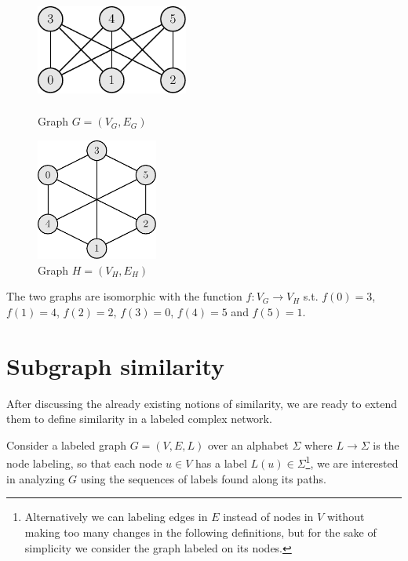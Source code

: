 \begin{esempio}
	\begin{figure}[h]
		\centering
		\begin{minipage}[t]{.45\textwidth}
			\centering
			\includegraphics[width=5cm,height=3.33cm]{figure/figure-2-3}
			\caption{Graph $G=(V_G, E_G)$}
		\end{minipage}\hfill
		\begin{minipage}[t]{.45\textwidth}
			\centering
			\includegraphics[width=4cm,height=4cm]{figure/figure-2-4}
			\caption{Graph $H=(V_H, E_H)$}
		\end{minipage}
	\end{figure}
	
	The two graphs are isomorphic with the function $f : V_{G} \rightarrow V_{H}$ s.t. $f(0) = 3$, $f(1) = 4$, $f(2) = 2$, $f(3) = 0$, $f(4) = 5$ and $f(5) = 1$. 
	
\end{esempio}

\section{Subgraph similarity}

After discussing the already existing notions of similarity, we are ready to extend them to define similarity in a labeled complex network.\medskip

Consider a labeled graph $G = (V, E, L)$ over an alphabet $\Sigma$ where $L \rightarrow \Sigma$ is the node labeling, so that each node $u \in V$ has a label $L(u) \in \Sigma$\footnote{Alternatively we can labeling edges in $E$ instead of nodes in $V$ without making too many changes in the following definitions, but for the sake of simplicity we consider the graph labeled on its nodes.}, we are interested in analyzing $G$ using the sequences of labels found along  its paths.\medskip

